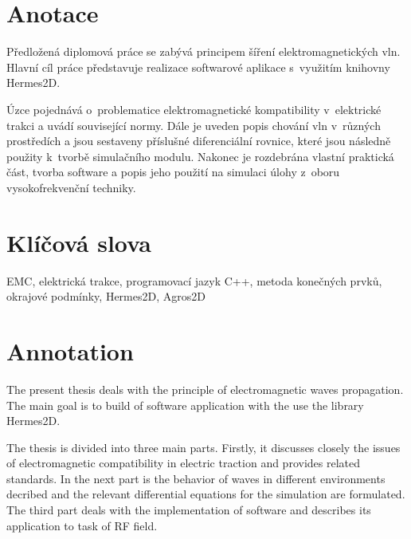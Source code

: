 
\renewcommand\thepage{}


\section*{Anotace}
Předložená diplomová práce se zabývá principem šíření elektromagnetických vln. Hlavní cíl práce představuje realizace softwarové aplikace s~využitím knihovny Hermes2D.

Úzce pojednává o~problematice elektromagnetické kompatibility v~elektrické trakci a uvádí související normy. Dále je uveden popis chování vln v~různých prostředích a jsou sestaveny příslušné diferenciální rovnice, které jsou následně použity k~tvorbě simulačního modulu.  Nakonec je rozdebrána vlastní praktická část, tvorba software a popis jeho použití na simulaci úlohy z~oboru vysokofrekvenční techniky.

\section*{Klíčová slova}
EMC, elektrická trakce, programovací jazyk C++, metoda konečných prvků, okrajové podmínky, Hermes2D, Agros2D

\bigskip

\section*{Annotation}
The present thesis deals with the principle of electromagnetic waves propagation. The main goal is to build of software application with the use the library Hermes2D.

The thesis is divided into three main parts. Firstly, it discusses closely the issues of electromagnetic compatibility in electric traction and provides related standards.
In the next part is the behavior of waves in different environments decribed and the relevant differential equations for the simulation are formulated. The third part deals with the implementation of software and describes its application to task of RF field.

